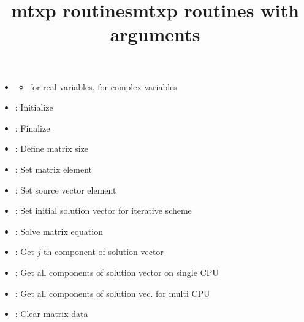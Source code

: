 \documentclass[12pt]{article}
\begin{document}
\title{mtxp routines}

\begin{itemize}
\item
  \begin{itemize}
  \item
     for real variables, 
     for complex variables
  \end{itemize}
\item
  : Initialize
\item
  : Finalize
\item
  : Define matrix size
\item
  : Set matrix element
\item
  : Set source vector element
\item
  : Set initial solution vector for iterative
  scheme
\item
  : Solve matrix equation
\item
  : Get $j$-th component of solution vector
\item
  : Get all components of solution vector on
  single CPU
\item
  : Get all components of solution vec. for
  multi CPU
\item
  : Clear matrix data
\end{itemize}
  
\title{mtxp routines with arguments}
\end{document}
